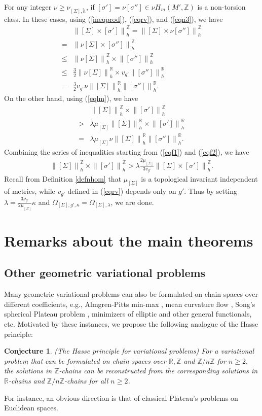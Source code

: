 \documentclass[11pt,a4paper]{amsart}
\numberwithin{equation}{section}
\newcommand{\lam}{\lambda}
\newcommand{\si}{\sigma}
\newcommand{\Si}{\Sigma}
\newcommand{\no}[1]{\left\lVert#1\right\rVert}
\newcommand{\ka}{\kappa}
\newcommand{\R}{\mathbb{R}}
\newcommand{\Z}{\mathbb{Z}}
\theoremstyle{plain}
\newtheorem{conj}{Conjecture}
\theoremstyle{definition}
\numberwithin{equation}{subsection}
\begin{document}
	For any integer $\nu\ge \nu_{[\Si],\check{h}}$, if $[\si']=\nu[\si'']\in \nu H_m(M',\Z)$ is a non-torsion class. 
	In these cases, using (\ref{ineqprod}), (\ref{eqrv}), and (\ref{eqn3}), we have
	\begin{align}\label{eqf1}
		&\no{[\Si]\times [\si']}^{\Z}_h=\no{[\Si]\times \nu[\si'']}_h^{\Z}\\=&\no{\nu[\Si]\times [\si'']}_h^{\Z}\\\le&\no{\nu[\Si]}_h^{\Z}\times \no{ [\si'']}_h^{\Z}\\\le&\frac{3}{2}\no{\nu[\Si]}_h^{\R}\times v_{g'}\no{ [\si'']}_h^{\R}\\
		=&\frac{3}{2}v_{g'}\nu \no{[\Si]}_h^{\R}\no{ [\si'']}_h^{\R}.
	\end{align}
	On the other hand, using (\ref{eqlm}), we have
	\begin{align}\label{eqf2}
		&	\no{[\Si]}^{\Z}_h\times \no{[\si']}^{\Z}_h\\>& \lam\mu_{[\Si]}\no{[\Si]}_h^{\R}\times \no{[\si']}^{\R}_h\\
		=&	\lam\mu_{[\Si]}\nu\no{[\Si]}_h^{\R} \no{[\si'']}^{\R}_h.
	\end{align}
	Combining the series of inequalities starting from (\ref{eqf1}) and (\ref{eqf2}), we have
	\begin{align*}
		\no{[\Si]}^{\Z}_h\times \no{[\si']}^{\Z}_h>	\lam\frac{2\mu_{[\Si]}}{3v_{g'}}\no{[\Si]\times [\si']}^{\Z}_h.
	\end{align*}	Recall from Definition \ref{defnhom} that $\mu_{[\Si]}$ is a topological invariant independent of metrics, while $v_{g'}$ defined in (\ref{eqrv}) depends only on $g'.$ Thus by setting $\lam=\frac{3\nu_{g'}}{2\mu_{[\Si]}}\ka$ and $\Omega_{[\Si],g',\ka}=\Omega_{[\Si],\lam}$,	we are done.
\section{Remarks about the main theorems}\label{secrem}
	\subsection{Other geometric variational problems}
	Many geometric variational problems can also be formulated on chain spaces over different coefficients, e.g., Almgren-Pitts min-max \cite{JPmm,MNtsc}, mean curvature flow \cite{CMm1,BWcfm2}, Song's spherical Plateau problem \cite{ASsp}, minimizers of elliptic \cite{SSA} and other general functionals, etc. Motivated by these instances, we propose the following analogue of the Hasse principle:
	\begin{conj}\label{conj}(The Hasse principle for variational problems)
		For a variational problem that can be formulated on chain spaces over $\R,\Z$ and $\Z/n\Z$ for $n\ge 2,$ the solutions in $\Z$-chains can be reconstructed from the corresponding solutions in $\R$-chains and $\Z/n\Z$-chains for all $n \geq 2$.
	\end{conj} 
	For instance, an obvious direction is that of classical Plateau's problems on Euclidean spaces. 
	
\end{document}
